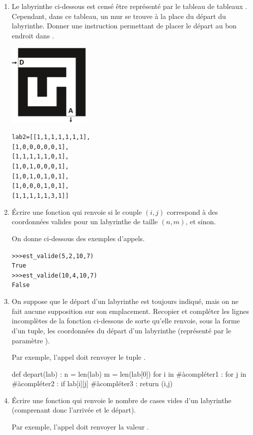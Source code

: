 \documentclass[11pt,a4paper,french,twoside]{PMCours}
\begin{document}
\begin{enumerate}
\item Le labyrinthe ci-dessous est censé être représenté par le tableau de tableaux .
Cependant, dans ce tableau, un mur se trouve à la place du départ du labyrinthe.
Donner une instruction permettant de placer le départ au bon endroit dans .
\begin{multicols}{2}
    \includegraphics[width=4cm]{BacBlanc2Sujet1_NSI2122-img2.png}

\begin{alltt}
lab2 = [[1, 1, 1, 1, 1, 1, 1],
        [1, 0, 0, 0, 0, 0, 1],
        [1, 1, 1, 1, 1, 0, 1],
        [1, 0, 1, 0, 0, 0, 1],
        [1, 0, 1, 0, 1, 0, 1],
        [1, 0, 0, 0, 1, 0, 1],
        [1, 1, 1, 1, 1, 3, 1]]
\end{alltt}
\end{multicols}
\item Écrire une fonction  qui renvoie  si le couple $(i,j)$
correspond à des coordonnées valides pour un labyrinthe de taille $(n,m)$, et  sinon.

On donne ci-dessous des exemples d'appels.
\begin{alltt}
>>> est\_valide(5, 2, 10, 7)
True
>>> est\_valide(10, 4, 10, 7)
False
\end{alltt}
\item On suppose que le départ d'un labyrinthe est toujours indiqué, mais on ne fait aucune
supposition sur son emplacement. Recopier et compléter les lignes incomplètes de la fonction  ci-dessous de sorte qu'elle renvoie, sous la forme d'un tuple, les coordonnées du départ d'un labyrinthe (représenté par le paramètre ). 

Par exemple, l'appel  doit renvoyer le tuple .
\begin{Python}
def depart(lab) :
    n = len(lab)
    m = len(lab[0])
    for i in #àcompléter1 : 
    	for j in #àcompléter2 :
    		if lab[i][j] #àcompléter3 :
    			return (i,j)
\end{Python}
\item Écrire une fonction  qui renvoie le nombre de cases vides d'un
labyrinthe (comprenant donc l'arrivée et le départ).

Par exemple, l'appel  doit renvoyer la valeur .
\end{enumerate}
\end{document}
